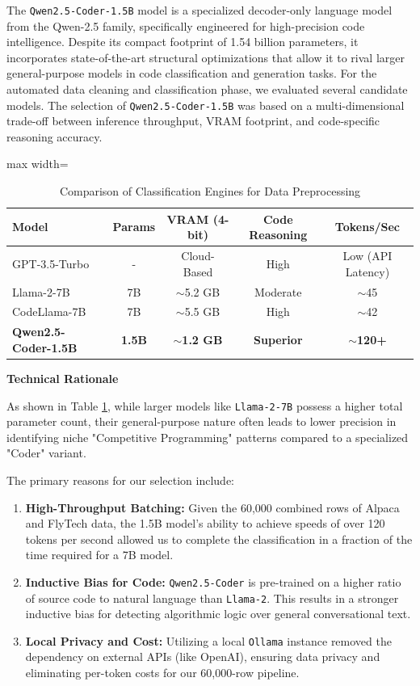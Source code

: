The \texttt{Qwen2.5-Coder-1.5B} model is a specialized decoder-only language model from the Qwen-2.5 family, specifically engineered for high-precision code intelligence. Despite its compact footprint of 1.54 billion parameters, it incorporates state-of-the-art structural optimizations that allow it to rival larger general-purpose models in code classification and generation tasks.
For the automated data cleaning and classification phase, we evaluated several candidate models. The selection of \texttt{Qwen2.5-Coder-1.5B} was based on a multi-dimensional trade-off between inference throughput, VRAM footprint, and code-specific reasoning accuracy.



\begin{table}[h]
\centering
\caption{Comparison of Classification Engines for Data Preprocessing}
\label{tab:model_comparison}
\begin{adjustbox}{max width=\textwidth}
\begin{tabular}{|l|c|c|c|c|}
\hline
\textbf{Model} & \textbf{Params} & \textbf{VRAM (4-bit)} & \textbf{Code Reasoning} & \textbf{Tokens/Sec} \\ \hline
GPT-3.5-Turbo & - & Cloud-Based & High & Low (API Latency) \\
Llama-2-7B & 7B & $\sim$5.2 GB & Moderate & $\sim$45 \\
CodeLlama-7B & 7B & $\sim$5.5 GB & High & $\sim$42 \\
\textbf{Qwen2.5-Coder-1.5B} & \textbf{1.5B} & \textbf{$\sim$1.2 GB} & \textbf{Superior} & \textbf{$\sim$120+} \\ \hline
\end{tabular}
\end{adjustbox}
\end{table}

\textbf{Technical Rationale}

As shown in Table \ref{tab:model_comparison}, while larger models like \texttt{Llama-2-7B} possess a higher total parameter count, their general-purpose nature often leads to lower precision in identifying niche "Competitive Programming" patterns compared to a specialized "Coder" variant. 

The primary reasons for our selection include:
\begin{enumerate}
    \item \textbf{High-Throughput Batching:} Given the 60,000 combined rows of Alpaca and FlyTech data, the 1.5B model's ability to achieve speeds of over 120 tokens per second allowed us to complete the classification in a fraction of the time required for a 7B model.
    \item \textbf{Inductive Bias for Code:} \texttt{Qwen2.5-Coder} is pre-trained on a higher ratio of source code to natural language than \texttt{Llama-2}. This results in a stronger inductive bias for detecting algorithmic logic over general conversational text.
    \item \textbf{Local Privacy and Cost:} Utilizing a local \texttt{Ollama} instance removed the dependency on external APIs (like OpenAI), ensuring data privacy and eliminating per-token costs for our 60,000-row pipeline.
\end{enumerate}



